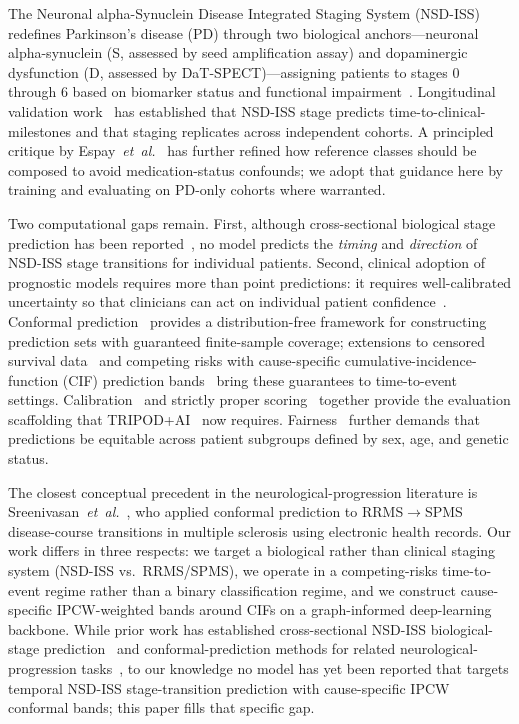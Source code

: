 \documentclass[11pt]{article}
\begin{document}
The Neuronal alpha-Synuclein Disease Integrated Staging System (NSD-ISS) redefines Parkinson's disease (PD) through two biological anchors---neuronal alpha-synuclein (S, assessed by seed amplification assay) and dopaminergic dysfunction (D, assessed by DaT-SPECT)---assigning patients to stages 0 through 6 based on biomarker status and functional impairment~\cite{simuni2024nsdiss}. Longitudinal validation work~\cite{simuni2024val,simuni2025,russo2025} has established that NSD-ISS stage predicts time-to-clinical-milestones and that staging replicates across independent cohorts. A principled critique by Espay~\textit{et~al.}~\cite{espay2025refutation} has further refined how reference classes should be composed to avoid medication-status confounds; we adopt that guidance here by training and evaluating on PD-only cohorts where warranted.

Two computational gaps remain. First, although cross-sectional biological stage prediction has been reported~\cite{dupre2026paper1}, no model predicts the \emph{timing} and \emph{direction} of NSD-ISS stage transitions for individual patients. Second, clinical adoption of prognostic models requires more than point predictions: it requires well-calibrated uncertainty so that clinicians can act on individual patient confidence~\cite{austin2020graphical,collins2024tripodai}. Conformal prediction~\cite{vovk2022conformal,shafer2008tutorial,angelopoulos2021gentle} provides a distribution-free framework for constructing prediction sets with guaranteed finite-sample coverage; extensions to censored survival data~\cite{candes2023conformal} and competing risks with cause-specific cumulative-incidence-function (CIF) prediction bands~\cite{confide2026} bring these guarantees to time-to-event settings. Calibration~\cite{guo2017calibration,naeini2015ece,hosmer2013applied} and strictly proper scoring~\cite{gneiting2007proper,graf1999brier,gerds2006consistent} together provide the evaluation scaffolding that TRIPOD+AI~\cite{collins2024tripodai} now requires. Fairness~\cite{rajkomar2018ensuring,chen2021ethical,obermeyer2019dissecting,mccradden2020ethical} further demands that predictions be equitable across patient subgroups defined by sex, age, and genetic status.

The closest conceptual precedent in the neurological-progression literature is Sreenivasan~\textit{et~al.}~\cite{sreenivasan2025}, who applied conformal prediction to RRMS$\to$SPMS disease-course transitions in multiple sclerosis using electronic health records. Our work differs in three respects: we target a biological rather than clinical staging system (NSD-ISS vs.\ RRMS/SPMS), we operate in a competing-risks time-to-event regime rather than a binary classification regime, and we construct cause-specific IPCW-weighted bands around CIFs on a graph-informed deep-learning backbone. While prior work has established cross-sectional NSD-ISS biological-stage prediction~\cite{dupre2026paper1} and conformal-prediction methods for related neurological-progression tasks~\cite{sreenivasan2025}, to our knowledge no model has yet been reported that targets temporal NSD-ISS stage-transition prediction with cause-specific IPCW conformal bands; this paper fills that specific gap.
\end{document}
